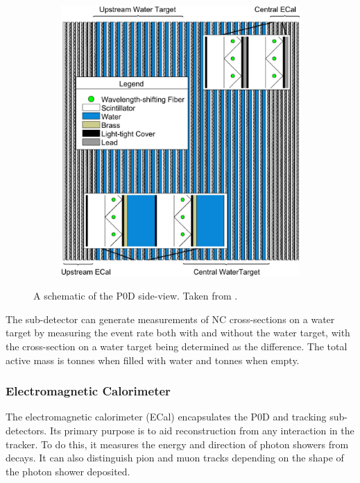\begin{figure}[h]
  \begin{subfigure}[t]{0.55\textwidth}
    \includegraphics[width=\textwidth, trim={0mm 0mm 0mm 0mm}, clip,page=1]{Figures/Detectors/T2KP0DDesign.pdf}
  \end{subfigure}
  \caption{A schematic of the P0D side-view. Taken from \cite{Assylbekov2012}.}
  \label{fig:T2KSKExp_T2K_P0DDesign}
\end{figure}

The sub-detector can generate measurements of NC cross-sections on a water target by measuring the event rate both with and without the water target, with the cross-section on a water target being determined as the difference. The total active mass is  tonnes when filled with water and  tonnes when empty.

\subsubsection{Electromagnetic Calorimeter}
\label{subsubsec:T2KSKExp_T2K_ECAL}

The electromagnetic calorimeter \cite{Allan_2013} (ECal) encapsulates the P0D and tracking sub-detectors. Its primary purpose is to aid  reconstruction from any interaction in the tracker. To do this, it measures the energy and direction of photon showers from \quickmath{\pi^0 \rightarrow 2\gamma} decays. It can also distinguish pion and muon tracks depending on the shape of the photon shower deposited.

